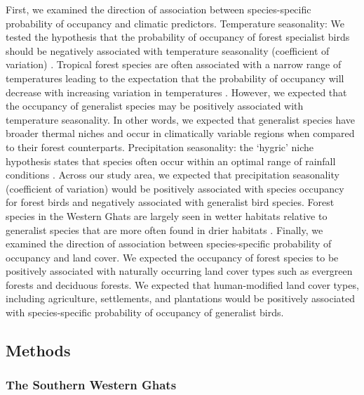 First, we examined the direction of association between species-specific probability of occupancy and climatic predictors.
Temperature seasonality: We tested the hypothesis that the probability of occupancy of forest specialist birds should be negatively associated with temperature seasonality (coefficient of variation) \citep{srinivasan2018a}.
Tropical forest species are often associated with a narrow range of temperatures leading to the expectation that the probability of occupancy will decrease with increasing variation in temperatures \citep{janzen1967,stevens1989,frishkoff2016,chan2016,srinivasan2018a}.
However, we expected that the occupancy of generalist species may be positively associated with temperature seasonality.
In other words, we expected that generalist species have broader thermal niches and occur in climatically variable regions when compared to their forest counterparts.
Precipitation seasonality: the `hygric' niche hypothesis states that species often occur within an optimal range of rainfall conditions \citep{boyle2020}.
Across our study area, we expected that precipitation seasonality (coefficient of variation) would be positively associated with species occupancy for forest birds and negatively associated with generalist bird species.
Forest species in the Western Ghats are largely seen in wetter habitats relative to generalist species that are more often found in drier habitats \citep{raman2006}.
Finally, we examined the direction of association between species-specific probability of occupancy and land cover.
We expected the occupancy of forest species to be positively associated with naturally occurring land cover types such as evergreen forests and deciduous forests.
We expected that human-modified land cover types, including agriculture, settlements, and plantations would be positively associated with species-specific probability of occupancy of generalist birds.

\subsection*{Methods}

\subsubsection*{The Southern Western Ghats}

